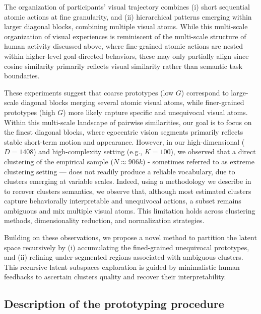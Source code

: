     The organization of participants’ visual trajectory combines (i) short sequential atomic actions at fine granularity, and (ii) hierarchical patterns emerging within larger diagonal blocks, combining multiple visual atoms. While this multi-scale organization of visual experiences is reminiscent of the multi-scale structure of human activity discussed above, where fine-grained atomic actions are nested within higher-level goal-directed behaviors, these may only partially align since cosine similarity primarily reflects visual similarity rather than semantic task boundaries.
    
    These experiments suggest that coarse prototypes (low $G$) correspond to large-scale diagonal blocks merging several atomic visual atoms, while finer-grained prototypes (high $G$) more likely capture specific and unequivocal visual atoms. Within this multi-scale landscape of pairwise similarities, our goal is to focus on the finest diagonal blocks, where egocentric vision segments primarily reflects stable short-term motion and appearance. %
    However, in our high-dimensional ($D=1408$) and high-complexity setting (e.g., $K=100$), we observed that a direct clustering of the empirical sample ($N \approx 906k$) - sometimes referred to as extreme clustering setting \cite{10.1145/3097983.3098079} — does not readily produce a reliable vocabulary, due to clusters emerging at variable scales. Indeed, using a methodology we describe in  to recover clusters semantics, we observe that, although most estimated clusters capture behaviorally interpretable and unequivocal actions, a subset remains ambiguous and mix multiple visual atoms. This limitation holds across clustering methods, dimensionality reduction, and normalization strategies. 
    
    Building on these observations, we propose a novel method to partition the latent space recursively by (i) accumulating the fined-grained unequivocal prototypes, and (ii) refining under-segmented regions associated with ambiguous clusters. This recursive latent subspaces exploration is guided by minimalistic human feedbacks to ascertain clusters quality and recover their interpretability. 
     
    \subsection{Description of the prototyping procedure}
    \label{sec:chapter_5_recursive_procedure}

